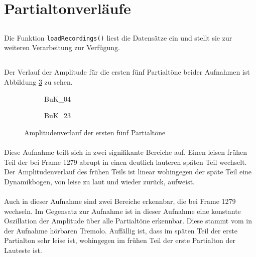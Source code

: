 \section{Partialtonverläufe}
\label{sec:1}

\subsection{}
Die Funktion \texttt{loadRecordings()} liest die Datensätze ein und stellt sie zur weiteren Verarbeitung zur Verfügung.

\subsection{}
Der Verlauf der Amplitude für die ersten fünf Partialtöne beider Aufnahmen ist Abbildung \ref{fig:ampl} zu sehen.

\begin{figure}[tbh]
    \centering
    \begin{subfigure}{.5\textwidth}
        \centering
        \caption{BuK\_04}
        \scalebox{0.5}{}
        \label{fig:amp04}
    \end{subfigure}%
    \begin{subfigure}{.5\textwidth}
        \centering
        \caption{BuK\_23}
        \scalebox{0.5}{}
        \label{fig:amp23}
    \end{subfigure}
    \caption{Amplitudenverlauf der ersten fünf Partialtöne}
    \label{fig:ampl}
\end{figure}

\paragraph{}
Diese Aufnahme teilt sich in zwei signifikante Bereiche auf.
Einen leisen frühen Teil der bei Frame 1279 abrupt in einen deutlich lauteren späten Teil wechselt.
Der Amplitudenverlauf des frühen Teils ist linear wohingegen der späte Teil eine Dynamikbogen, von leise zu laut und wieder zurück, aufweist.

\paragraph{}
Auch in dieser Aufnahme sind zwei Bereiche erkennbar, die bei Frame 1279 wechseln.
Im Gegensatz zur Aufnahme  ist in dieser Aufnahme eine konstante Oszillation der Amplitude über alle Partialtöne erkennbar.
Diese stammt vom in der Aufnahme hörbaren Tremolo.
Auffällig ist, dass im späten Teil der erste Partialton sehr leise ist, wohingegen im frühen Teil der erste Partialton der Lauteste ist.


